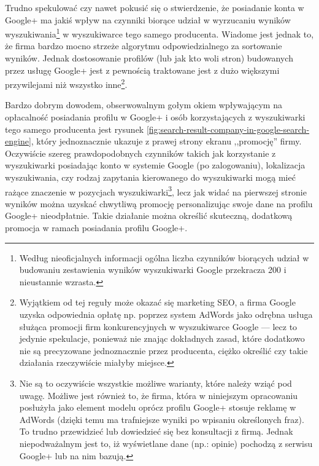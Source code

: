 Trudno spekulować czy nawet pokusić się o stwierdzenie, że posiadanie konta w Google+ ma jakiś wpływ na czynniki biorące udział w wyrzucaniu wyników wyszukiwania\footnote{Według nieoficjalnych informacji ogólna liczba czynników biorących udział w budowaniu zestawienia wyników wyszukiwarki Google przekracza 200 i nieustannie wzrasta.} w wyszukiwarce tego samego producenta. Wiadome jest jednak to, że firma bardzo mocno strzeże algorytmu odpowiedzialnego za sortowanie wyników. Jednak dostosowanie profilów (lub jak kto woli stron) budowanych przez usługę Google+ jest z pewnością traktowane jest z dużo większymi przywilejami niż wszystko inne\footnote{Wyjątkiem od tej reguły może okazać się marketing SEO, a firma Google uzyska odpowiednia opłatę np. poprzez system AdWords jako odrębna usługa służąca promocji firm konkurencyjnych w wyszukiwarce Google --- lecz to jedynie spekulacje, ponieważ nie znając dokładnych zasad, które dodatkowo nie są precyzowane jednoznacznie przez producenta, ciężko określić czy takie działania rzeczywiście miałyby miejsce.}.

Bardzo dobrym dowodem, obserwowalnym gołym okiem wpływającym na opłacalność posiadania profilu w Google+ i osób korzystających z wyszukiwarki tego samego producenta jest rysunek \ref{fig:search-result-company-in-google-search-engine}, który jednoznacznie ukazuje z prawej strony ekranu ,,promocję'' firmy. Oczywiście szereg prawdopodobnych czynników takich jak korzystanie z wyszukiwarki posiadając konto w systemie Google (po zalogowaniu), lokalizacja wyszukiwania, czy rodzaj zapytania kierowanego do wyszukiwarki mogą mieć rażące znaczenie w pozycjach wyszukiwarki\footnote{Nie są to oczywiście wszystkie możliwe warianty, które należy wziąć pod uwagę. Możliwe jest również to, że firma, która w niniejszym opracowaniu posłużyła jako element modelu oprócz profilu Google+ stosuje reklamę w AdWords (dzięki temu ma trafniejsze wyniki po wpisaniu określonych fraz). To trudno przewidzieć lub dowiedzieć się bez konsultacji z firmą. Jednak niepodważalnym jest to, iż wyświetlane dane (np.: opinie) pochodzą z serwisu Google+ lub na nim bazują.}, lecz jak widać na pierwszej stronie wyników można uzyskać chwytliwą promocję personalizując swoje dane na profilu Google+ nieodpłatnie. Takie działanie można określić skuteczną, dodatkową promocja w ramach posiadania profilu Google+.

